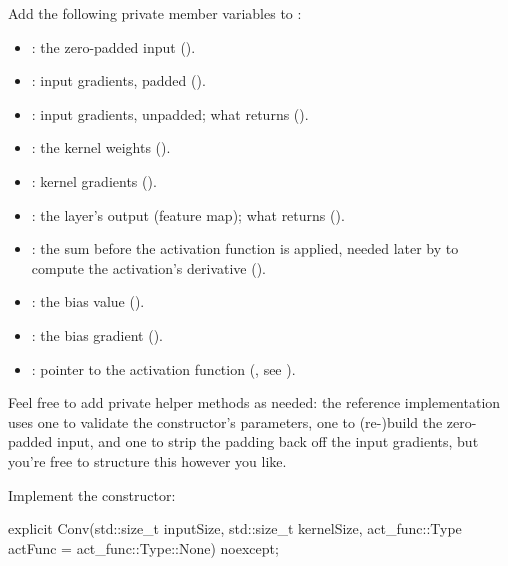 \label{c8:ex:3}
Add the following private member variables to :
\begin{itemize}
  \item \textbf{}: the zero-padded input ().
  \item \textbf{}: input gradients, padded ().
  \item \textbf{}: input gradients, unpadded; what 
    returns ().
  \item \textbf{}: the kernel weights ().
  \item \textbf{}: kernel gradients ().
  \item \textbf{}: the layer's output (feature map); what  returns
    ().
  \item \textbf{}: the sum before the activation function is applied,
    needed later by  to compute the activation's derivative
    ().
  \item \textbf{}: the bias value ().
  \item \textbf{}: the bias gradient ().
  \item \textbf{}: pointer to the activation function (, see
    ).
\end{itemize}
Feel free to add private helper methods as needed: the reference implementation uses one to
validate the constructor's parameters, one to (re-)build the zero-padded input, and one to strip
the padding back off the input gradients, but you're free to structure this however you like.

\label{c8:ex:4}
Implement the constructor:

\begin{cppcode}
explicit Conv(std::size_t inputSize, std::size_t kernelSize,
              act_func::Type actFunc = act_func::Type::None) noexcept;
\end{cppcode}

